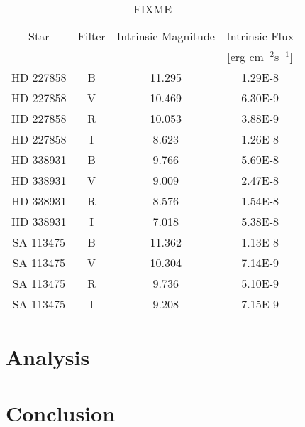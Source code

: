 \documentclass{article}
\begin{document}
\begin{table}
\begin{center}
\begin{tabular}{c | c | c | c}
Star & Filter & Intrinsic Magnitude & Intrinsic Flux \\
& & & [erg cm$^{-2}$s$^{-1}$] \\
\hline
HD 227858 & B & 11.295 & 1.29E-8\\
HD 227858 & V & 10.469  & 6.30E-9\\
HD 227858 & R & 10.053 & 3.88E-9\\
HD 227858 & I  & 8.623 & 1.26E-8\\
HD 338931 & B & 9.766 & 5.69E-8\\
HD 338931 & V & 9.009  & 2.47E-8\\
HD 338931 & R & 8.576 & 1.54E-8\\
HD 338931 & I & 7.018 & 5.38E-8\\
SA 113475 & B & 11.362 & 1.13E-8\\
SA 113475 & V & 10.304 & 7.14E-9\\
SA 113475 & R  & 9.736 & 5.10E-9\\
SA 113475 & I  & 9.208 & 7.15E-9\\
\end{tabular}
\caption{FIXME}
\label{table:realflux}
\end{center}
\end{table}


\section{Analysis}





\section{Conclusion}






\begin{thebibliography}{9}

\end{thebibliography}
\end{document}
